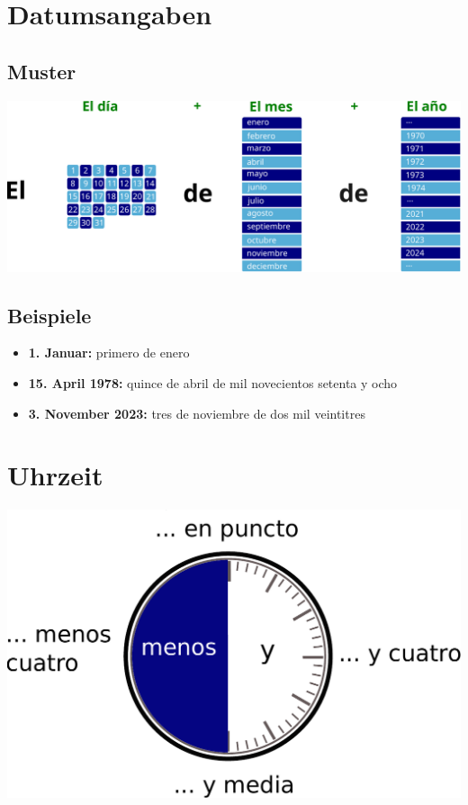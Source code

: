 \documentclass{spanish_summary}
\begin{document}
\section*{Datumsangaben}
\subsection*{Muster}
\begin{center}
  \includegraphics[scale=0.6]{datum.pdf}
\end{center}


\subsection*{Beispiele}
\begin{itemize}
  \item \textbf{1. Januar: } primero de enero
  \item \textbf{15. April 1978: } quince de abril de mil novecientos setenta y ocho
  \item \textbf{3. November 2023: } tres de noviembre de dos mil veintitres
\end{itemize}

\newpage

\section*{Uhrzeit}

\begin{center}
  \includegraphics[scale=0.6]{uhrzeit.pdf}
\end{center}
\end{document}

